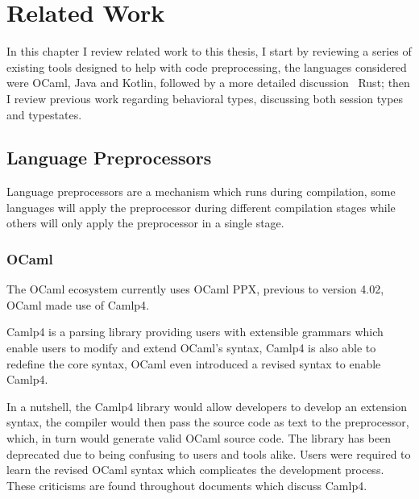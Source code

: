 
\chapter{Related Work}\label{cha:related-work}

In this chapter I review related work to this thesis,
I start by reviewing a series of existing tools designed to help with code preprocessing,
the languages considered were OCaml, Java and Kotlin, followed by a more detailed discussion \wrt~Rust;
then I review previous work regarding behavioral types, discussing both session types and typestates.


\section{Language Preprocessors}\label{sec:lang-preprocessors}
Language preprocessors are a mechanism which runs during compilation,
some languages will apply the preprocessor during different compilation stages while others will only apply the preprocessor in a single stage.

\subsection{OCaml}\label{sec:lang-preprocessors:ocaml}

The OCaml ecosystem currently uses OCaml \gls{PPX},
previous to version 4.02, OCaml made use of \gls{Camlp4}.

\gls{Camlp4} is a parsing library providing users with extensible grammars which enable users to modify and extend OCaml's syntax,
\gls{Camlp4} is also able to redefine the core syntax,
OCaml even introduced a revised syntax to enable \gls{Camlp4}.

In a nutshell, the \gls{Camlp4} library would allow developers to develop an extension syntax,
the compiler would then pass the source code as text to the preprocessor,
which, in turn would generate valid OCaml source code.
The library has been deprecated due to being confusing to users and tools alike.
Users were required to learn the revised OCaml syntax which complicates the development process.
These criticisms are found throughout documents which discuss \gls{Camlp4}.

